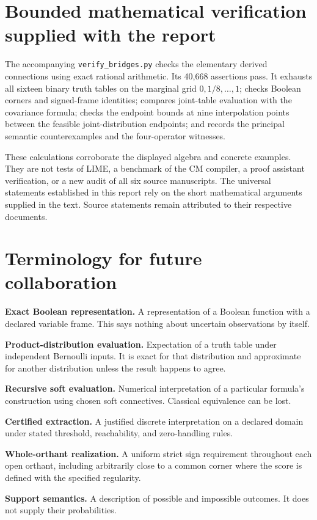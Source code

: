\documentclass[11pt,a4paper]{article}
\theoremstyle{remark}
\begin{document}
\section{Bounded mathematical verification supplied with the report}
The accompanying \texttt{verify\_bridges.py} checks the elementary derived connections using exact rational arithmetic. Its 40,668 assertions pass. It exhausts all sixteen binary truth tables on the marginal grid $0,1/8,\ldots,1$; checks Boolean corners and signed-frame identities; compares joint-table evaluation with the covariance formula; checks the endpoint bounds at nine interpolation points between the feasible joint-distribution endpoints; and records the principal semantic counterexamples and the four-operator witnesses.

These calculations corroborate the displayed algebra and concrete examples. They are not tests of LIME, a benchmark of the CM compiler, a proof assistant verification, or a new audit of all six source manuscripts. The universal statements established in this report rely on the short mathematical arguments supplied in the text. Source statements remain attributed to their respective documents.

\section{Terminology for future collaboration}
\textbf{Exact Boolean representation.} A representation of a Boolean function with a declared variable frame. This says nothing about uncertain observations by itself.

\textbf{Product-distribution evaluation.} Expectation of a truth table under independent Bernoulli inputs. It is exact for that distribution and approximate for another distribution unless the result happens to agree.

\textbf{Recursive soft evaluation.} Numerical interpretation of a particular formula's construction using chosen soft connectives. Classical equivalence can be lost.

\textbf{Certified extraction.} A justified discrete interpretation on a declared domain under stated threshold, reachability, and zero-handling rules.

\textbf{Whole-orthant realization.} A uniform strict sign requirement throughout each open orthant, including arbitrarily close to a common corner where the score is defined with the specified regularity.

\textbf{Support semantics.} A description of possible and impossible outcomes. It does not supply their probabilities.
\end{document}
